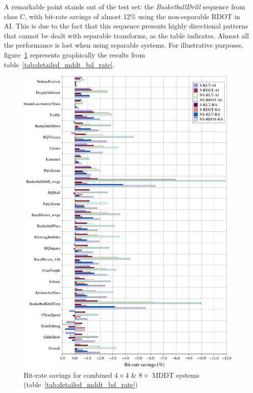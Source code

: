 \documentclass[11pt,a4paper,openright,twoside]{book}
\numberwithin{equation}{section} %
\numberwithin{figure}{section} %
\numberwithin{table}{section} %
\begin{document}
A remarkable point stands out of the test set: the \emph{BasketballDrill}
sequence from class C, with bit-rate savings of almost 12\% using the
non-separable \ac{RDOT} in \ac{AI}.
This is due to the fact that this sequence presents highly directional
patterns that cannot be dealt with separable transforms, as the table
indicates.
Almost all the performance is lost when using separable systems.
For illustrative purposes, figure~\ref{fig:detailed_mddt_bd_rate} represents
graphically the results from table~\ref{tab:detailed_mddt_bd_rate}.

\begin{figure}[tp]
	\centering
	\includegraphics[width=1\linewidth]{./figures/detailed_mddt_4_8.pdf}
	\caption{Bit-rate savings for combined $4\times4$ \& $8\times$ \acs{MDDT}
	systems (table~\ref{tab:detailed_mddt_bd_rate})}
	\label{fig:detailed_mddt_bd_rate}
\end{figure}
\end{document}
